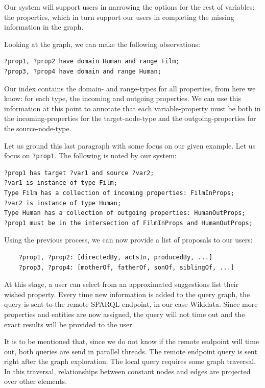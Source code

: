 \begin{example}
Our system will support users in narrowing the options for the rest of variables: the properties, which in turn support our users in completing the missing information in the graph.

Looking at the graph, we can make the following observations:
\begin{verbatim}
?prop1, ?prop2 have domain Human and range Film;
?prop3, ?prop4 have domain and range Human;
\end{verbatim}

Our index contains the domain- and range-types for all properties, from here we know: for each type, the incoming and outgoing properties. 
We can use this information at this point to annotate that each variable-property must be both in the incoming-properties for the target-node-type and the outgoing-properties for the source-node-type.

Let us ground this last paragraph with some focus on our given example. Let us focus on \texttt{?prop1}. The following is noted by our system:
\begin{verbatim}
?prop1 has target ?var1 and source ?var2;
?var1 is instance of type Film;
Type Film has a collection of incoming properties: FilmInProps;
?var2 is instance of type Human;
Type Human has a collection of outgoing properties: HumanOutProps;
?prop1 must be in the intersection of FilmInProps and HumanOutProps;
\end{verbatim}

Using the previous process, we can now provide a list of proposals to our users:
\begin{verbatim}
    ?prop1, ?prop2: [directedBy, actsIn, producedBy, ...]
    ?prop3, ?prop4: [motherOf, fatherOf, sonOf, siblingOf, ...]
\end{verbatim}

At this stage, a user can select from an approximated suggestions list their wished property. 
Every time new information is added to the query graph, the query is sent to the remote SPARQL endpoint, in our case Wikidata. 
Since more properties and entities are now assigned, the query will not time out and the exact results will be provided to the user.

\end{example}

It is to be mentioned that, since we do not know if the remote endpoint will time out, both queries are send in parallel threads. The remote endpoint query is sent right after the graph exploration. The local query requires some graph traversal. In this traversal, relationships between constant nodes and edges are projected over other elements.

